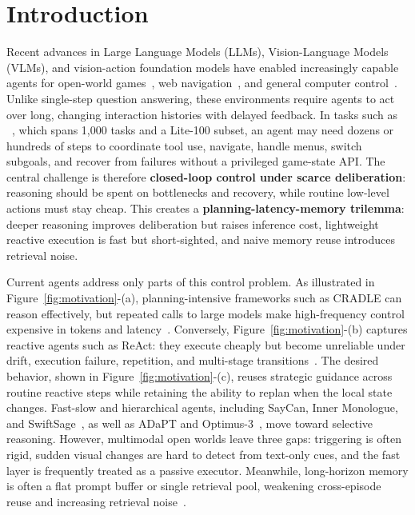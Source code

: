 \section{Introduction}
\label{sec:introduction}

Recent advances in Large Language Models (LLMs), Vision-Language Models
(VLMs), and vision-action foundation models have enabled increasingly capable
agents for open-world games~\citep{wang2024voyager,magne2026nitrogen}, web
navigation~\citep{zhou2023webarena,deng2023mind2web}, and general computer
control~\citep{liu2024agentbench,tan2024cradle}. Unlike single-step question
answering, these environments require agents to act over long, changing
interaction histories with delayed feedback. In tasks such as
\stardojo{}~\citep{tan2025stardojo}, which spans 1,000 tasks and a Lite-100
subset, an agent may need dozens or hundreds of steps to coordinate tool use,
navigate, handle menus, switch subgoals, and recover from failures without a
privileged game-state API. The central challenge is therefore \textbf{closed-loop
control under scarce deliberation}: reasoning should be spent on bottlenecks and
recovery, while routine low-level actions must stay cheap. This creates a
\textbf{planning-latency-memory trilemma}: deeper reasoning improves
deliberation but raises inference cost, lightweight reactive execution is fast
but short-sighted, and naive memory reuse introduces retrieval noise.

Current agents address only parts of this control problem. As illustrated in
Figure~\mbox{\ref{fig:motivation}}-(a), planning-intensive frameworks such as
CRADLE can reason effectively, but repeated calls to large models make
high-frequency control expensive in tokens and latency~\citep{tan2024cradle}.
Conversely, Figure~\mbox{\ref{fig:motivation}}-(b) captures reactive agents such
as ReAct: they execute cheaply but become unreliable under drift, execution
failure, repetition, and multi-stage transitions~\citep{yao2023react}.
The desired behavior, shown in Figure~\mbox{\ref{fig:motivation}}-(c), reuses
strategic guidance across routine reactive steps while retaining the ability to
replan when the local state changes. Fast-slow and hierarchical agents, including
SayCan, Inner Monologue, and SwiftSage~\citep{ahn2022saycan,huang2022innermonologue,lin2023swiftsage},
as well as ADaPT and Optimus-3~\citep{prasad2024adapt,li2025optimus3}, move
toward selective reasoning. However, multimodal open worlds leave three
gaps: triggering is often rigid, sudden visual changes are hard to detect from
text-only cues, and the fast layer is frequently treated as a passive executor.
Meanwhile, long-horizon memory is often a flat prompt buffer or single
retrieval pool, weakening cross-episode reuse and increasing retrieval
noise~\mbox{\citep{park2023generativeagents,packer2023memgpt}}.

